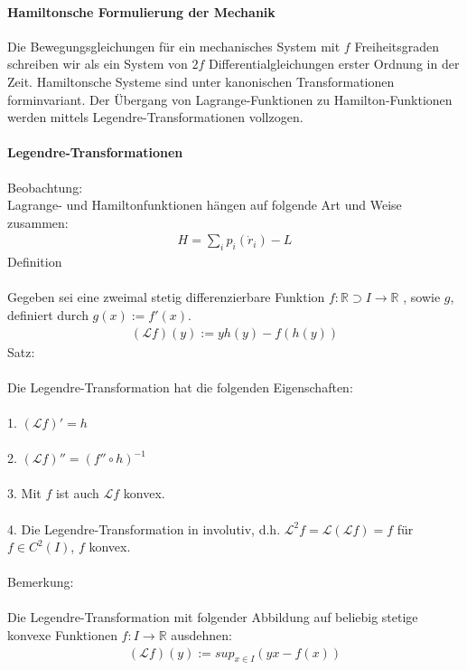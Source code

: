 \documentclass[10pt,a4paper]{article}
\begin{document}
\paragraph{Hamiltonsche Formulierung der Mechanik} $\,$\\
Die Bewegungsgleichungen für ein mechanisches System mit $f$ Freiheitsgraden schreiben wir als ein System von $2f$ Differentialgleichungen erster Ordnung in der Zeit. Hamiltonsche Systeme sind unter kanonischen Transformationen forminvariant. Der Übergang von Lagrange-Funktionen zu Hamilton-Funktionen werden mittels Legendre-Transformationen vollzogen.
\paragraph{Legendre-Transformationen} $\,$ \\
Beobachtung: \\
Lagrange- und Hamiltonfunktionen hängen auf folgende Art und Weise zusammen:
\begin{align}
H=\sum_i p_i(\dot{r}_i)-L
\end{align}
Definition\\
\\
Gegeben sei eine zweimal stetig differenzierbare Funktion $ f: \mathbb{R}\supset I \longrightarrow \mathbb{R} $ , sowie $g$, definiert durch $g(x):= f'(x)$. 
\begin{align}
(\mathcal{L}f)(y):=yh(y)-f(h(y))
\end{align}
Satz:\\
\\
Die Legendre-Transformation hat die folgenden Eigenschaften:\\
\\
1. $(\mathcal{L}f)'=h$\\
\\
2. $(\mathcal{L}f)''=(f'' \circ h)^{-1} $\\
\\
3. Mit $f$ ist auch $ \mathcal{L}f$ konvex.\\
\\
4. Die Legendre-Transformation in involutiv, d.h. $\mathcal{L}^2f= \mathcal{L}(\mathcal{L}f)=f $ für $ f \in C^2(I)$, $f$ konvex.\\
\\
Bemerkung:\\
\\
Die Legendre-Transformation mit folgender Abbildung auf beliebig stetige konvexe Funktionen $f: I \longrightarrow \mathbb{R}$ ausdehnen:
\begin{align}
(\mathcal{L}f)(y):= sup_{x \in I}(yx-f(x))
\end{align}
\end{document}
